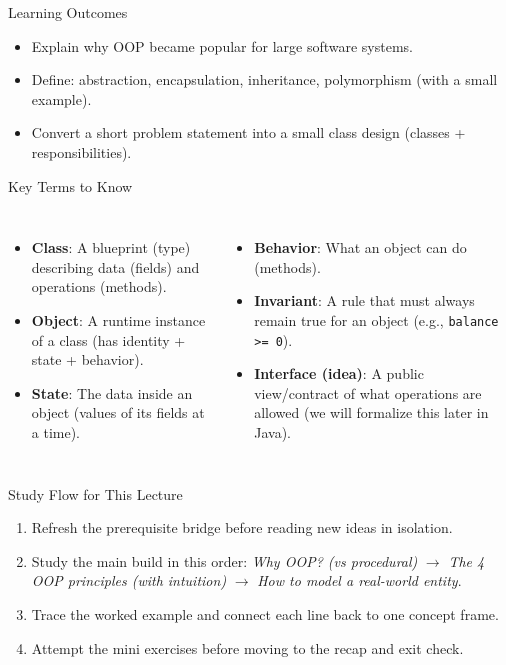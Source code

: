 \documentclass{beamer}
\begin{document}
\begin{frame}{Learning Outcomes}
  \begin{itemize}[<+->]
    \item Explain why OOP became popular for large software systems.
    \item Define: abstraction, encapsulation, inheritance, polymorphism (with a small example).
    \item Convert a short problem statement into a small class design (classes + responsibilities).
  \end{itemize}
  \slidesources{\OOPSUnitISources}
\end{frame}

\begin{frame}{Key Terms to Know}
\small
\begin{columns}[t]
\begin{itemize}
  \item \textbf{Class}: A blueprint (type) describing data (fields) and operations (methods).
  \item \textbf{Object}: A runtime instance of a class (has identity + state + behavior).
  \item \textbf{State}: The data inside an object (values of its fields at a time).
\end{itemize}
\begin{itemize}
  \item \textbf{Behavior}: What an object can do (methods).
  \item \textbf{Invariant}: A rule that must always remain true for an object (e.g., \texttt{balance >= 0}).
  \item \textbf{Interface (idea)}: A public view/contract of what operations are allowed (we will formalize this later in Java).
\end{itemize}
\end{columns}
  \slidesources{\OOPSUnitISources}
\end{frame}

\begin{frame}{Study Flow for This Lecture}
\begin{enumerate}[<+->]
  \item Refresh the prerequisite bridge before reading new ideas in isolation.
  \item Study the main build in this order: \textit{Why OOP? (vs procedural)} $\rightarrow$ \textit{The 4 OOP principles (with intuition)} $\rightarrow$ \textit{How to model a real-world entity}.
  \item Trace the worked example and connect each line back to one concept frame.
  \item Attempt the mini exercises before moving to the recap and exit check.
\end{enumerate}
  \slidesources{\OOPSUnitISources}
\end{frame}
\end{document}
